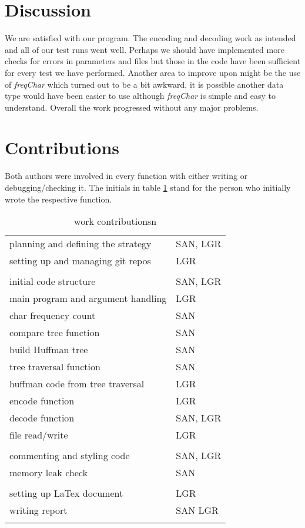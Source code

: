 \documentclass[a4paper,11pt,twoside]{article}
\begin{document}
\section{Discussion}
We are satisfied with our program. The encoding and decoding work as intended and all of our test runs went well. Perhaps we should have implemented more checks for errors in parameters and files but those in the code have been sufficient for every test we have performed. Another area to improve upon might be the use of \emph{freqChar} which turned out to be a bit awkward, it is possible another data type would have been easier to use although \emph{freqChar} is simple and easy to understand. Overall the work progressed without any major problems. 

\section{Contributions}
Both authors were involved in every function with either writing or
debugging/checking it. The initials in table \ref{tab:contribution}
stand for the person who initially wrote the respective function.


\begin{table}[]
\centering
\caption{work contributionsn}
\label{tab:contribution}
\begin{tabular}{ll}
planning and defining the strategy & SAN, LGR \\
setting up and managing git repos  & LGR      \\
                                   &          \\
initial code structure             & SAN, LGR \\
main program and argument handling & LGR      \\
char frequency count               & SAN      \\
compare tree function              & SAN      \\
build Huffman tree                 & SAN      \\
tree traversal function            & SAN      \\
huffman code from tree traversal   & LGR      \\
encode function                    & LGR      \\
decode function                    & SAN, LGR \\
file read/write                    & LGR      \\
                                   &          \\
commenting and styling code        & SAN, LGR \\
memory leak check                  & SAN      \\
                                   &          \\
setting up LaTex document          & LGR      \\
writing report                     & SAN LGR  \\
                                   &         
\end{tabular}
\end{table}



\end{document}
